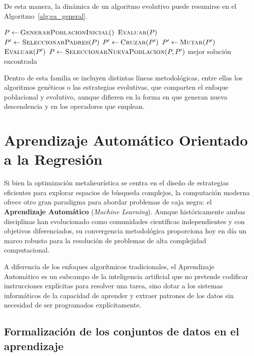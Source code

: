 De esta manera, la dinámica de un algoritmo evolutivo puede resumirse en el Algoritmo~\ref{alg:ea_general}.

\begin{algorithm}[H]
    \caption{Esquema general de un algoritmo evolutivo}
    \label{alg:ea_general}
    \begin{algorithmic}[1]
        \State $P \gets \textsc{GenerarPoblacionInicial}()$
        \State $\textsc{Evaluar}(P)$
        \State $P' \gets \textsc{SeleccionarPadres}(P)$
        \State $P' \gets \textsc{Cruzar}(P')$
        \State $P' \gets \textsc{Mutar}(P')$
        \State $\textsc{Evaluar}(P')$
        \State $P \gets \textsc{SeleccionarNuevaPoblacion}(P, P')$
        \EndWhile
        \State \Return mejor solución encontrada
    \end{algorithmic}
\end{algorithm}

Dentro de esta familia se incluyen distintas líneas metodológicas, entre ellas los algoritmos genéticos o las estrategias evolutivas, que comparten el enfoque poblacional y evolutivo, aunque difieren en la forma en que generan nueva descendencia y en los operadores que emplean.

\section{Aprendizaje Automático Orientado a la Regresión}
\label{sec:aprendizaje_automatico}

Si bien la optimización metaheurística se centra en el diseño de estrategias eficientes para explorar espacios de búsqueda complejos, la computación moderna ofrece otro gran paradigma para abordar problemas de caja negra: el \textbf{Aprendizaje Automático} (\textit{Machine Learning}). Aunque históricamente ambas disciplinas han evolucionado como comunidades científicas independientes y con objetivos diferenciados, su convergencia metodológica proporciona hoy en día un marco robusto para la resolución de problemas de alta complejidad computacional.

A diferencia de los enfoques algorítmicos tradicionales, el Aprendizaje Automático es un subcampo de la inteligencia artificial que no pretende codificar instrucciones explícitas para resolver una tarea, sino dotar a los sistemas informáticos de la capacidad de aprender y extraer patrones de los datos sin necesidad de ser programados explícitamente.

\subsection{Formalización de los conjuntos de datos en el aprendizaje}

